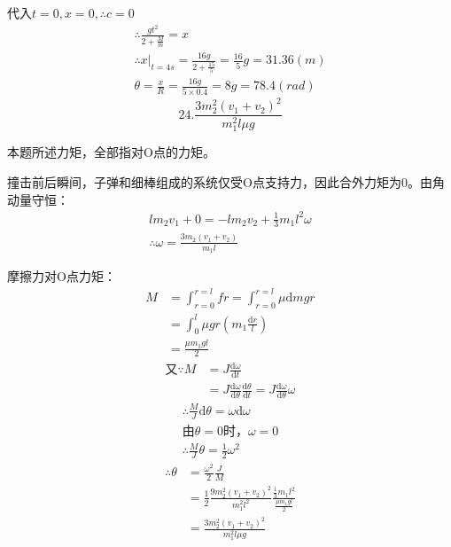 \documentclass[blue, normal]{./templete/qyxfnote}
\newcommand{\di}[1]{\mathrm{d}#1}
\newcommand{\dy}[2]{\frac{\di{#1}}{\di{#2}}}
\begin{document}
\begin{multicols}{2}
			代入$ t=0,x=0,\therefore c=0 $
			\begin{gather*}
			\therefore \frac{gt^2}{2+\frac{M}{m}}=x\\
			\therefore x\left.\right|_{t=4s}=\frac{16g}{2+\frac{15}{5}}=\frac{16}{5}g=31.36(m)\\
			\theta=\frac{x}{R}=\frac{16g}{5\times 0.4}=8g=78.4(rad)
			\end{gather*}
			\[24.\frac{3m_2^2(v_1+v_2)^2}{m_1^2l\mu g}\]\par
			本题所述力矩，全部指对O点的力矩。\par
			撞击前后瞬间，子弹和细棒组成的系统仅受O点支持力，因此合外力矩为0。由角动量守恒：
			\begin{gather*}
			lm_2v_1+0=-lm_2v_2+\frac{1}{3}m_1l^2\omega\\
			\therefore \omega=\frac{3m_2(v_1+v_2)}{m_1l}
			\end{gather*}\par
			摩擦力对O点力矩：
			\begin{align*}
			M	&=\int_{r=0}^{r=l}fr=\int_{r=0}^{r=l}\mu \di{m}gr\\
			&=\int_0^l\mu gr\left(m_1\frac{\di{r}}{l}\right)\\
			&=\frac{\mu m_1gl}{2}
			\end{align*}
			\begin{align*}
			\text{又}\because M&=J\dy{\omega}{t}\\
			&=J\dy{\omega}{\theta}\dy{\theta}{t}=J\dy{\omega}{\theta}\omega
			\end{align*}
			\begin{gather*}
			\therefore \frac{M}{J}\di{\theta}=\omega\di{\omega}\\
			\text{由}\theta=0\text{时}，\omega=0\\
			\therefore \frac{M}{J}\theta=\frac{1}{2}\omega^2
			\end{gather*}
			\begin{align*}
			\therefore \theta&=\frac{\omega^2}{2}\frac{J}{M}\\
			&=\frac{1}{2}\frac{9m_2^2(v_1+v_2)^2}{m_1^2l^2}\frac{\frac{1}{3}m_1l^2}{\frac{\mu m_1gl}{2}}\\
			&=\frac{3m_2^2(v_1+v_2)^2}{m_1^2l\mu g}
			\end{align*}
		\end{multicols}
	
	
\end{document}
